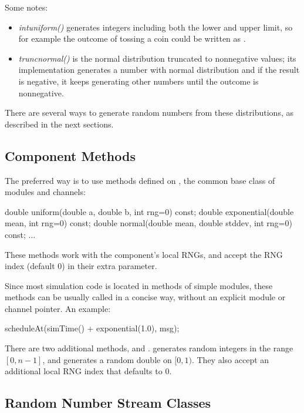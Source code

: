 Some notes:

\begin{itemize}
\item \textit{intuniform()} generates integers including both the lower and upper
    limit, so for example the outcome of tossing a coin could be written as
    .
\item \textit{truncnormal()} is the normal distribution truncated to nonnegative
    values; its implementation generates a number with normal distribution and
    if the result is negative, it keeps generating other numbers until the
    outcome is nonnegative.
\end{itemize}

There are several ways to generate random numbers from these distributions,
as described in the next sections.

\subsection{Component Methods}
\label{sec:sim-lib:random-variate-component-methods}

The preferred way is to use methods defined on , the
common base class of modules and channels:

\begin{cpp}
double uniform(double a, double b, int rng=0) const;
double exponential(double mean, int rng=0) const;
double normal(double mean, double stddev, int rng=0) const;
...
\end{cpp}

These methods work with the component's local RNGs, and accept the RNG
index (default 0) in their extra  parameter.

Since most simulation code is located in methods of simple modules, these
methods can be usually called in a concise way, without an explicit module
or channel pointer. An example:

\begin{cpp}
scheduleAt(simTime() + exponential(1.0), msg);
\end{cpp}

There are two additional methods,  and .
 generates random integers in the range $[0, n-1]$, and
 generates a random double on $[0,1)$. They also accept
an additional local RNG index that defaults to 0.

\subsection{Random Number Stream Classes}
\label{sec:sim-lib:random-number-stream-classes}

